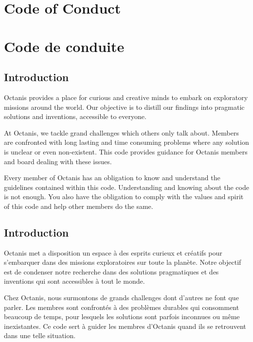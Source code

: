 
\renewcommand{\thesubsection}{\arabic{subsection}}

\english
	\section*{Code of Conduct}

\french
	\section*{Code de conduite}



\english
	\subsection{Introduction}
	{\semibold Octanis provides a place for curious and creative minds to embark on exploratory missions around the world. Our objective is to distill our findings into pragmatic solutions and inventions, accessible to everyone. }


	At Octanis, we tackle grand challenges which others only talk about. Members are confronted with long lasting and time consuming problems where any solution is unclear or even non-existent. This code provides guidance for Octanis members and board dealing with these issues.

	Every member of Octanis has an obligation to know and understand the guidelines contained within this code.
	Understanding and knowing about the code is not enough. You also have the obligation to comply with the values and spirit of this code and help other members do the same.

	\vspace{2.05cm}

\french
	\subsection{Introduction}
	{\semibold Octanis met a disposition un espace à des esprits curieux et créatifs pour s'embarquer dans des missions exploratoires sur toute la planète. Notre objectif est de condenser notre recherche dans des solutions pragmatiques et des inventions qui sont accessibles à tout le monde. }


	Chez Octanis, nous surmontons de grands challenges dont d'autres ne font que parler. Les membres sont confrontés à des problèmes durables qui consomment beaucoup de temps, pour lesquels les solutions sont parfois inconnues ou même inexistantes. Ce code sert à guider les membres d'Octanis quand ils se retrouvent dans une telle situation. 

